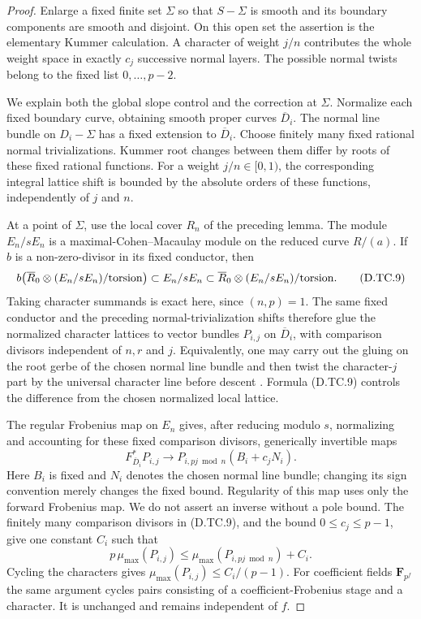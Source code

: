 \begin{proof}
Enlarge a fixed finite set $\Sigma$ so that $S-\Sigma$ is
smooth and its boundary components are smooth and disjoint.
On this open set the assertion is the elementary Kummer
calculation.  A character of weight $j/n$ contributes the
whole weight space in exactly $c_j$ successive normal
layers.  The possible normal twists belong to the fixed
list $0,\ldots,p-2$.

We explain both the global slope control and the correction
at $\Sigma$.  Normalize each fixed boundary curve, obtaining
smooth proper curves $\overline D_i$.  The normal line
bundle on $D_i-\Sigma$ has a fixed extension to
$\overline D_i$.  Choose finitely many fixed rational
normal trivializations.  Kummer root changes between
them differ by roots of these fixed rational functions.
For a weight $j/n\in[0,1)$, the corresponding integral
lattice shift is bounded by the absolute orders of
these functions, independently of $j$ and $n$.

At a point of $\Sigma$, use the local cover $R_n$ of the
preceding lemma.  The module $E_n/sE_n$ is a
maximal-Cohen--Macaulay module on the reduced curve
$R/(a)$.  If $b$ is a non-zero-divisor in its fixed
conductor, then
\[
 b\bigl(\overline R_0\otimes(E_n/sE_n)/{\rm torsion}\bigr)
                  \subset E_n/sE_n
                  \subset
       \overline R_0\otimes(E_n/sE_n)/{\rm torsion}.
                                                        \tag{D.TC.9}
\]
Taking character summands is exact here, since
$(n,p)=1$.  The same fixed conductor and the preceding
normal-trivialization shifts therefore glue the normalized
character lattices to vector bundles $P_{i,j}$ on
$\overline D_i$, with comparison divisors independent
of $n,r$ and $j$.  Equivalently, one may carry out the
gluing on the root gerbe of the chosen normal line bundle
and then twist the character-$j$ part by the universal
character line before descent
\citep[Proposition~3 and Theorem~4, pp.~11--16]{Borne2007D}
\citep[Theorem~6.1, pp.~33--36]{BorneVistoli2012D}.
Formula (D.TC.9) controls
the difference from the chosen normalized local lattice.

The regular Frobenius map on $E_n$ gives, after reducing
modulo $s$, normalizing and accounting for these fixed
comparison divisors, generically invertible maps
\[
       F_{\overline D_i}^*P_{i,j}
                  \longrightarrow
       P_{i,pj\bmod n}(B_i+c_jN_i).                      \tag{D.TC.10}
\]
Here $B_i$ is fixed and $N_i$ denotes the chosen normal
line bundle; changing its sign convention merely changes
the fixed bound.  Regularity of this map uses only the
forward Frobenius map.  We do not assert an inverse
without a pole bound.  The finitely many comparison
divisors in (D.TC.9), and the bound $0\le c_j\le p-1$,
give one constant $C_i$ such that
\[
 p\,\mu_{\max}(P_{i,j})
             \le \mu_{\max}(P_{i,pj\bmod n})+C_i.
\]
Cycling the characters gives
$\mu_{\max}(P_{i,j})\le C_i/(p-1)$.
For coefficient fields $\mathbf F_{p^f}$ the same argument
cycles pairs consisting of a coefficient-Frobenius stage
and a character.  It is unchanged and remains independent
of $f$.


\end{proof}
